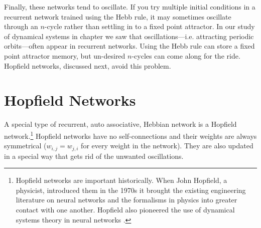 Finally, these networks tend to oscillate. If you try multiple initial conditions in a recurrent network trained using the Hebb rule, it may sometimes oscillate through an $n$-cycle rather than settling in to a fixed point attractor. In our study of dynamical systems in chapter  we saw that oscillations---i.e. attracting periodic orbits---often appear in recurrent networks. Using the Hebb rule can store a fixed point attractor memory, but un-desired $n$-cycles can come along for the ride. Hopfield networks, discussed next, avoid this problem.



\section{Hopfield Networks}

A special type of recurrent, auto associative, Hebbian network is a Hopfield network.\footnote{Hopfield networks are important historically. When John Hopfield, a physicist, introduced them in the 1970s it brought the existing engineering literature on neural networks and the formalisms in physics into greater contact with one another. Hopfield also pioneered the use of dynamical systems theory in neural networks \cite{hopfield1982neural}.}  Hopfield networks have no self-connections and their weights are always symmetrical ($w_{i,j} = w_{j,i}$ for every weight in the network). They are also updated in a special way that gets rid of the unwanted oscillations.

